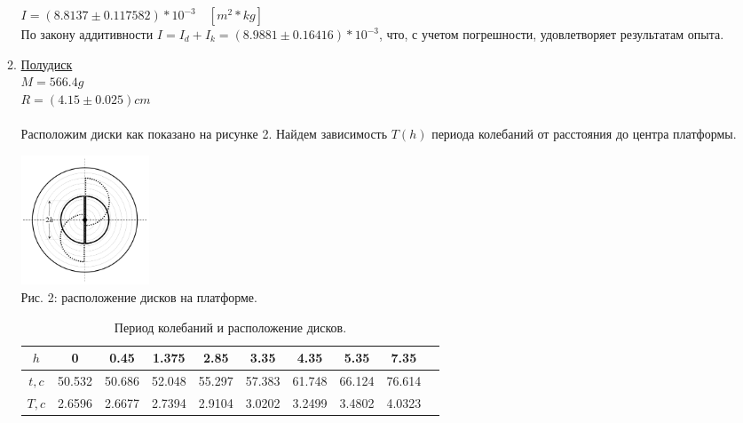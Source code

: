\documentclass[12pt]{article}
\begin{document}
\begin{enumerate}
\begin{enumerate}
                    $I = (8.8137 \pm 0.117582) * 10^{-3} \quad [m^2 * kg]$ \\
                    По закону аддитивности $I = I_d + I_k = (8.9881 \pm 0.16416) * 10^{-3}$, что, с учетом погрешности, удовлетворяет результатам опыта.
                \item \underline{Полудиск} \\
                    $M = 566.4g$ \\ 
                    $R = (4.15 \pm 0.025)cm$ \\ \\
                    Расположим диски как показано на рисунке 2. Найдем зависимость $T(h)$ периода колебаний от расстояния до центра платформы.
                    \begin{center} 
                        \includegraphics[width=1.5in]{disk.png} \\ Рис. 2: расположение дисков на платформе.
                    \end{center}

                    \begin{table}[h]
                        \caption{Период колебаний и расположение дисков.}
                        \begin{center}
                        \begin{tabular}{|c|c|c|c|c|c|c|c|c|c|}
                            \hline 
                                $h$ & 0 & 0.45 & 1.375 & 2.85 & 3.35 & 4.35 & 5.35 & 7.35 \\
                            \hline
                                $t,c$ & 50.532 & 50.686 & 52.048 & 55.297 & 57.383& 61.748 & 66.124 & 76.614 \\
                            \hline
                                $T,c$ & 2.6596 & 2.6677 & 2.7394 & 2.9104 & 3.0202 & 3.2499 
                                & 3.4802 & 4.0323 \\
                            \hline
                        \end{tabular}
                        \end{center}
                    \end{table}



\end{enumerate}
\end{enumerate}
\end{document}
